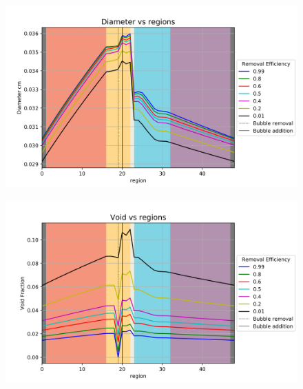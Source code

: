 \FloatBarrier
\newpage
\FloatBarrier

\begin{figure}[p] 
\centering
\begin{minipage}{.5\textwidth}
  \centering
  \includegraphics[width=1.0\linewidth]{images/EffDiameter.png}
  \label{fig:EffDia}
\end{minipage}%
\begin{minipage}{.5\textwidth}
  \centering
  \includegraphics[width=1.0\linewidth]{images/EffVoid.png}
  \label{fig:EffVoid}
\end{minipage}
\end{figure}

